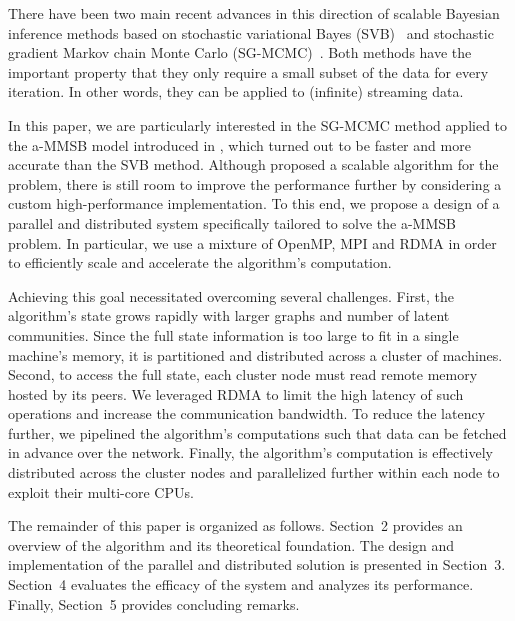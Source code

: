 There have been two main recent advances in this direction of scalable Bayesian inference methods based on stochastic variational Bayes (SVB)~\cite{hoffman2013stochastic,gopalan2013efficient,gopalan2012scalable} and stochastic gradient Markov chain Monte Carlo (SG-MCMC)~\cite{welling2011bayesian,patterson2013stochastic,ahn2014distributed,ahn2012bayesian}. Both methods have the important property that they only require a small subset of the data for every iteration. In other words, they can be applied to (infinite) streaming data.

In this paper, we are particularly interested in the SG-MCMC method applied to the a-MMSB model introduced in \cite{LiAW15}, which turned out to be faster and more accurate than the SVB method. Although \cite{LiAW15} proposed a scalable algorithm for the problem, there is still room to improve the performance further by considering a custom high-performance implementation. To this end, we propose a design of a parallel and distributed system specifically tailored to solve the a-MMSB problem. In particular, we use a mixture of OpenMP, MPI and RDMA in order to efficiently scale and accelerate the algorithm's computation.

Achieving this goal necessitated overcoming several challenges. First, the algorithm's state grows rapidly with larger graphs and number of latent communities. Since the full state information is too large to fit in a single machine's memory, it is partitioned and distributed across a cluster of machines. Second, to access the full state, each cluster node must read remote memory hosted by its peers. We leveraged RDMA to limit the high latency of such operations and increase the communication bandwidth. To reduce the latency further, we pipelined the algorithm's computations such that data can be fetched in advance over the network. Finally, the algorithm's computation is effectively distributed across the cluster nodes and parallelized further within each node to exploit their multi-core CPUs.

The remainder of this paper is organized as follows. Section~2 provides an overview of the algorithm and its theoretical foundation. The design and implementation of the parallel and distributed solution is presented in Section~3. Section~4 evaluates the efficacy of the system and analyzes its performance. Finally, Section~5 provides concluding remarks.



